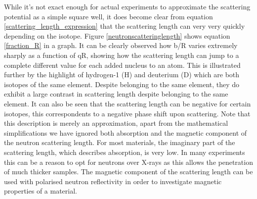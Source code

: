 While it's not exact enough for actual experiments to approximate the scattering potential as a simple square well, it does become clear from equation \ref{scattering_length_expression} that the scattering length can very very quickly depending on the isotope. Figure \ref{neutronscatteringlength} shows equation \ref{fraction_R} in a graph. It can be clearly observed how b/R varies extremely sharply as a function of qR, showing how the scattering length can jump to a complete different value for each added nucleus to an atom. This is illustrated further by the highlight of hydrogen-1 (H) and deuterium (D) which are both isotopes of the same element. Despite belonging to the same element, they do exhibit a large contrast in scattering length despite belonging to the same element. It can also be seen that the scattering length can be negative for certain isotopes, this correspondents to a negative phase shift upon scattering.  Note that this description is merely an approximation, apart from the mathematical simplifications we have ignored both absorption and the magnetic component of the neutron scattering length. For most materials, the imaginary part of the scattering length, which describes absorption, is very low. In many experiments this can be a reason to opt for neutrons over X-rays as this allows the penetration of much thicker samples. The magnetic component of the scattering length can be used with polarised neutron reflectivity in order to investigate magnetic properties of a material.
